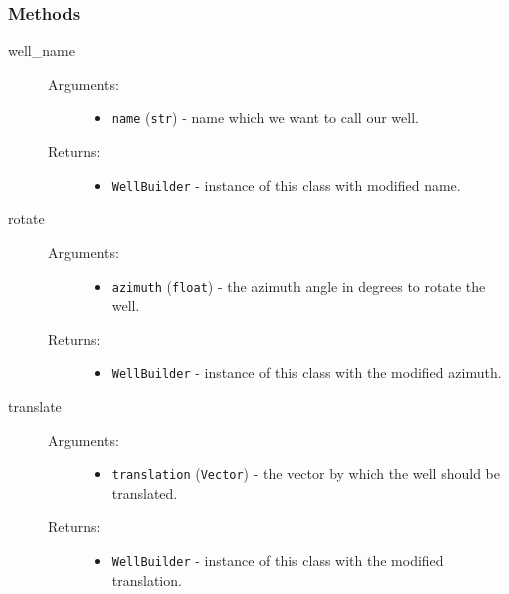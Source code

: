 	\subsubsection{Methods}
	\begin{description}

		\item[ \colorbox{gray!20}{well\_name}] \hfill
		\begin{description}
			\item[Arguments:] \hfill
			\begin{itemize}
				\item \texttt{name} (\texttt{str}) - name which we want to call our well.
			\end{itemize}
			\item[Returns:] \hfill
			\begin{itemize}
				\item \texttt{WellBuilder} - instance of this class with modified name.
			\end{itemize}
		\end{description}

		\item[ \colorbox{gray!20}{rotate}] \hfill
		\begin{description}
			\item[Arguments:] \hfill
			\begin{itemize}
				\item \texttt{azimuth} (\texttt{float}) - the azimuth angle in degrees to rotate the well.
			\end{itemize}
			\item[Returns:] \hfill
			\begin{itemize}
				\item \texttt{WellBuilder} - instance of this class with the modified azimuth.
			\end{itemize}
		\end{description}

		\item[ \colorbox{gray!20}{translate}] \hfill
		\begin{description}
			\item[Arguments:] \hfill
			\begin{itemize}
				\item \texttt{translation} (\texttt{Vector}) - the vector by which the well should be translated.
			\end{itemize}
			\item[Returns:] \hfill
			\begin{itemize}
				\item \texttt{WellBuilder} - instance of this class with the modified translation.
			\end{itemize}
		\end{description}


\end{description}
